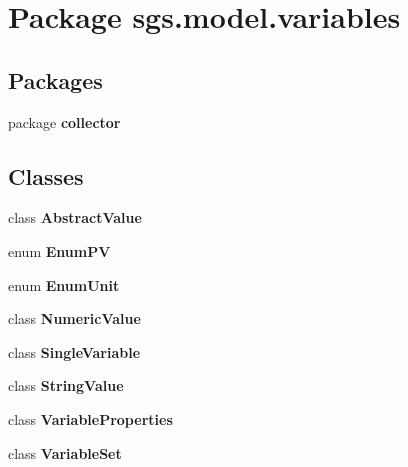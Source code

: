\section{Package sgs.\-model.\-variables}
\label{namespacesgs_1_1model_1_1variables}
\subsection*{Packages}
\begin{DoxyCompactItemize}
\item 
package {\bf collector}
\end{DoxyCompactItemize}
\subsection*{Classes}
\begin{DoxyCompactItemize}
\item 
class {\bf Abstract\-Value}
\item 
enum {\bf Enum\-P\-V}
\item 
enum {\bf Enum\-Unit}
\item 
class {\bf Numeric\-Value}
\item 
class {\bf Single\-Variable}
\item 
class {\bf String\-Value}
\item 
class {\bf Variable\-Properties}
\item 
class {\bf Variable\-Set}
\end{DoxyCompactItemize}
